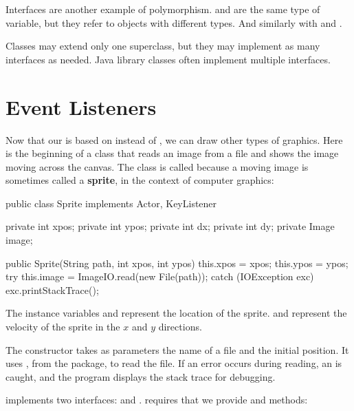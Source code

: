 Interfaces are another example of polymorphism.
 and  are the same type of variable, but they refer to objects with different types.
And similarly with  and .


Classes may extend only one superclass, but they may implement as many interfaces as needed.
Java library classes often implement multiple interfaces.


\section{Event Listeners}


Now that our  is based on  instead of , we can draw other types of graphics.
Here is the beginning of a class that reads an image from a file and shows the image moving across the canvas.
The class is called  because a moving image is sometimes called a {\bf sprite}, in the context of computer graphics:

\begin{code}
public class Sprite implements Actor, KeyListener {
    private int xpos;
    private int ypos;
    private int dx;
    private int dy;
    private Image image;

    public Sprite(String path, int xpos, int ypos) {
        this.xpos = xpos;
        this.ypos = ypos;
        try {
            this.image = ImageIO.read(new File(path));
        } catch (IOException exc) {
            exc.printStackTrace();
        }
    }
}
\end{code}

The instance variables  and  represent the location of the sprite.
 and  represent the velocity of the sprite in the $x$ and $y$ directions.


The constructor takes as parameters the name of a file and the initial position.
It uses , from the  package, to read the file.
If an error occurs during reading, an  is caught, and the program displays the stack trace for debugging.

 implements two interfaces:  and .
 requires that we provide  and  methods:

